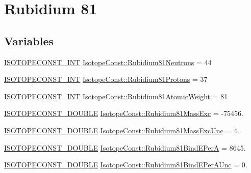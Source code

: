 \hypertarget{group___isotope_const-_rubidium-_rb81}{}\section{Rubidium 81}
\label{group___isotope_const-_rubidium-_rb81}
\subsection*{Variables}
\begin{DoxyCompactItemize}
\item 
\mbox{\hyperlink{group___isotope_const-_macros_ga5f18360b3e99483a35c32d789e62621c}{I\+S\+O\+T\+O\+P\+E\+C\+O\+N\+S\+T\+\_\+\+I\+NT}} \mbox{\hyperlink{group___isotope_const-_rubidium-_rb81_gab600a29a6f9c3e61149a788937a2e715}{Isotope\+Const\+::\+Rubidium81\+Neutrons}} = 44
\item 
\mbox{\hyperlink{group___isotope_const-_macros_ga5f18360b3e99483a35c32d789e62621c}{I\+S\+O\+T\+O\+P\+E\+C\+O\+N\+S\+T\+\_\+\+I\+NT}} \mbox{\hyperlink{group___isotope_const-_rubidium-_rb81_ga9960bf78cdedad395723a3283394822f}{Isotope\+Const\+::\+Rubidium81\+Protons}} = 37
\item 
\mbox{\hyperlink{group___isotope_const-_macros_ga5f18360b3e99483a35c32d789e62621c}{I\+S\+O\+T\+O\+P\+E\+C\+O\+N\+S\+T\+\_\+\+I\+NT}} \mbox{\hyperlink{group___isotope_const-_rubidium-_rb81_ga973faa7912e512e50d7ad915da77a028}{Isotope\+Const\+::\+Rubidium81\+Atomic\+Weight}} = 81
\item 
\mbox{\hyperlink{group___isotope_const-_macros_ga8f45a7272ce02c0b4c65c44636ed719a}{I\+S\+O\+T\+O\+P\+E\+C\+O\+N\+S\+T\+\_\+\+D\+O\+U\+B\+LE}} \mbox{\hyperlink{group___isotope_const-_rubidium-_rb81_ga70a645d9ce0b75cd557d90ddfb868e47}{Isotope\+Const\+::\+Rubidium81\+Mass\+Exc}} = -\/75456.
\item 
\mbox{\hyperlink{group___isotope_const-_macros_ga8f45a7272ce02c0b4c65c44636ed719a}{I\+S\+O\+T\+O\+P\+E\+C\+O\+N\+S\+T\+\_\+\+D\+O\+U\+B\+LE}} \mbox{\hyperlink{group___isotope_const-_rubidium-_rb81_ga793d0b74df05ac3cf0115f0b5c61121a}{Isotope\+Const\+::\+Rubidium81\+Mass\+Exc\+Unc}} = 4.
\item 
\mbox{\hyperlink{group___isotope_const-_macros_ga8f45a7272ce02c0b4c65c44636ed719a}{I\+S\+O\+T\+O\+P\+E\+C\+O\+N\+S\+T\+\_\+\+D\+O\+U\+B\+LE}} \mbox{\hyperlink{group___isotope_const-_rubidium-_rb81_gab210ad4dd7c177d639f052da0ec49e86}{Isotope\+Const\+::\+Rubidium81\+Bind\+E\+PerA}} = 8645.
\item 
\mbox{\hyperlink{group___isotope_const-_macros_ga8f45a7272ce02c0b4c65c44636ed719a}{I\+S\+O\+T\+O\+P\+E\+C\+O\+N\+S\+T\+\_\+\+D\+O\+U\+B\+LE}} \mbox{\hyperlink{group___isotope_const-_rubidium-_rb81_ga3a5af0b6d6f900561b1403c0585fa5d2}{Isotope\+Const\+::\+Rubidium81\+Bind\+E\+Per\+A\+Unc}} = 0.

\end{DoxyCompactItemize}
